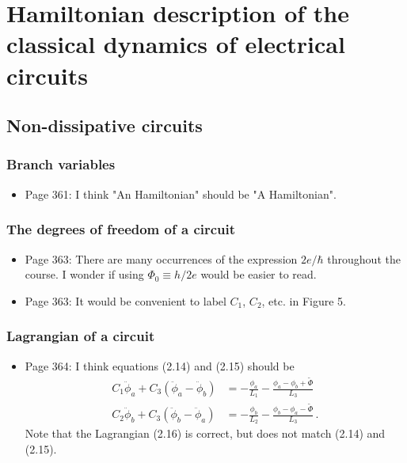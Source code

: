 \section{Hamiltonian description of the classical dynamics of electrical circuits}

\subsection{Non-dissipative circuits}

\subsubsection{Branch variables}

\begin{itemize}

\item Page 361: I think "An Hamiltonian" should be "A Hamiltonian".

\end{itemize}

\subsubsection{The degrees of freedom of a circuit}

\begin{itemize}

\item Page 363: There are many occurrences of the expression $2e / \hbar$ throughout the course. I wonder if using $\Phi_0 \equiv h / 2e$ would be easier to read.

\item Page 363: It would be convenient to label $C_1$, $C_2$, etc. in Figure 5.

\end{itemize}

\subsubsection{Lagrangian of a circuit}

\begin{itemize}

\item Page 364: I think equations (2.14) and (2.15) should be
\begin{align}
C_1 \ddot{\phi}_a + C_3 ( \ddot{\phi}_a - \ddot{\phi}_b) &= - \frac{\phi_a}{L_1} - \frac{\phi_a - \phi_b + \tilde{\Phi}}{L_3} \nonumber \\
C_2 \ddot{\phi}_b + C_3 ( \ddot{\phi}_b - \ddot{\phi}_a) &= - \frac{\phi_b}{L_2} - \frac{\phi_b - \phi_a - \tilde{\Phi}}{L_3} \nonumber \, .
\end{align}
Note that the Lagrangian (2.16) is correct, but does not match (2.14) and (2.15).

\end{itemize}

